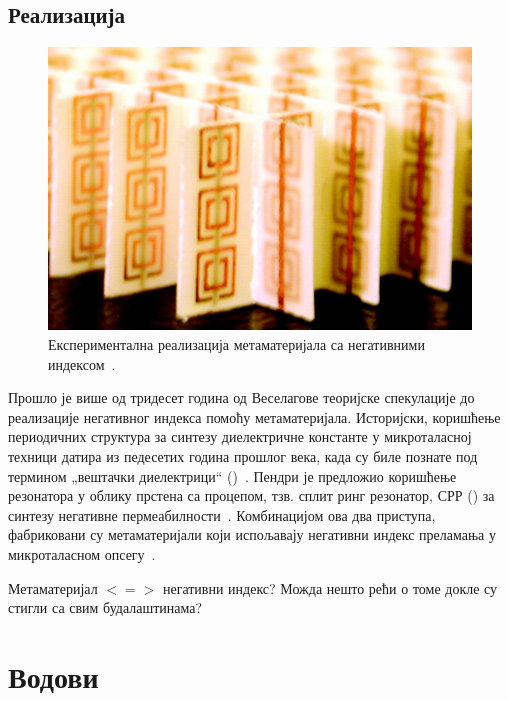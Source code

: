 \documentclass[12pt,oneside]{book}
\begin{document}
\subsection{Реализација}

\begin{figure}[h]
    \centering
    \includegraphics[width=0.8\linewidth]{sl_uvod/mm_smit.jpg}
    \caption{Експериментална реализација метаматеријала са негативними индексом~\cite{smith:00}.}
    \label{uvod:mm_smit}
\end{figure}
Прошло је више од тридесет година од Веселагове теоријске спекулације до реализације негативног индекса помоћу метаматеријала. Историјски, коришћење периодичних структура за синтезу диелектричне константе у микроталасној техници датира из педесетих година прошлог века, када су биле познате под термином „вештачки диелектрици`` ()~\cite{rotman1962plasma}. Пендри је предложио коришћење резонатора у облику прстена са процепом, тзв. сплит ринг резонатор, СРР () за синтезу негативне пермеабилности~\cite{pendri:99}. Комбинацијом ова два приступа, фабриковани су метаматеријали који испољавају негативни индекс преламања у микроталасном опсегу~\cite{smith:00}.

Метаматеријал $<=>$ негативни индекс? Можда нешто рећи о томе докле су стигли са свим будалаштинама?

\section{Водови}



\end{document}
